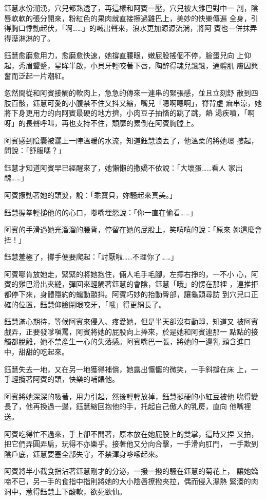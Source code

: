 鈺慧水份潮湧，穴兒都熟透了，再這樣和阿賓一壓，穴兒被大雞巴對中一
剖，陰唇軟軟的張分開來，粉紅色的果肉就直接擦過雞巴上，美妙的快樂傳遍
全身，引得胸口悸動起伏，「啊……」的喊出聲來，浪水更加源源流淌，將阿
賓也一併抹弄得溼淋淋的了。

鈺慧愈磨愈用力，愈磨愈快速，她撐直腰眼，嫩屁股搖個不停，臉蛋兒向
上仰起，秀眉顰蹙，星眸半啟，小貝牙輕咬著下唇，陶醉得魂兒飄飄，通體肌
膚因興奮而泛起一片潮紅。

忽然間從和阿賓接觸的軟肉上，急急的傳來一連串的緊張感，並且立刻舒
散到四肢百骸，鈺慧可愛的小腹禁不住又抖又縮，嘴兒「嗯啊嗯啊」，脊背虛
痲串涼，她將下身更用力的向阿賓最硬的地方擠，小肉豆子抽慉的跳了跳，熱
湯疾噴，「啊呀」的長聲呼叫，再也支持不住，頹靡的累倒在阿賓胸膛上。

阿賓感到陰囊被灑上一陣溫暖的水流，知道鈺慧浪丟了，他溫柔的將她環
摟起，問說：「舒服嗎？」

鈺慧才知道阿賓早已經醒來了，她懶懶的撒嬌不依說：「大壞蛋……看人
家出醜……」

阿賓撩動著她的頭髮，說：「乖寶貝，妳騷起來真美。」

鈺慧握拳輕搥他的的心口，嘟嘴埋怨說：「你一直在偷看……」

阿賓的手滑過她光溜溜的腰背，停留在她的屁股上，笑嘻嘻的說：「原來
妳這麼會扭！」

鈺慧羞極了，撐手便要爬起：「討厭啦……不理你了……」

阿賓哪肯放她走，緊緊的將她抱住，倆人毛手毛腳，左擰右掙的，一不小
心，阿賓的雞巴滑出夾縫，彈回來輕觸著鈺慧的會陰，鈺慧「哦」的愣在那裡
，連推拒都停下來，身體隱約的蠕動顫抖。阿賓巧妙的抬動臀部，讓龜頭尋訪
到穴兒口正確的位置，鈺慧仰臉閉眼咬牙，「哦」得更綿長了。

鈺慧滿心期待，等候阿賓來侵入、疼愛她，但是半天卻沒有動靜，知道又
被阿賓戲弄，正要發嗲嗔罵，阿賓將她的屁股向上捧來，於是她和阿賓連那一
點點的接觸都脫離，她不禁產生一心的失落感。阿賓嘴巴一張，將她的一邊乳
頭含進口中，甜甜的吃起來。

鈺慧失去一地，又在另一地獲得補償，她露出懨懨的微笑，一手斜撐在床
上，一手輕攬著阿賓的頭，快樂的哺餵他。

阿賓將她深深的吸著，用力引起，然後輕輕放掉，鈺慧挺硬的小紅豆被他
吮得變長了，他再換過一邊，鈺慧縮回抱他的手，托起自己傲人的乳房，直向
他嘴裡送。

阿賓吃得忙不過來，手上卻不閒著，原本放在她屁股上的雙掌，這時又捏
又拍，把它們弄圓弄扁，玩得不亦樂乎。接著他又分向合擊，一手滑向肛門，
一手欺到陰戶底，鈺慧要塞全部失守，不禁渾身哆嗦起來。

阿賓將半小截食指沾著鈺慧剛才的分泌，一撥一撥的騷在鈺慧的菊花上，
讓她嬌啼不已，另一手的食指中指則將她的大小陰唇撩撥夾拉，偶而侵入濕熱
緊湊的肉洞中，惹得鈺慧上下酸軟，欲死欲仙。

